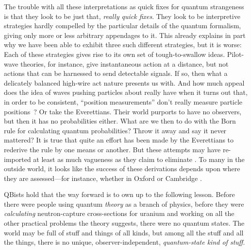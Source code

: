 \documentclass[aps,pra,superscriptaddress,12pt,tightenlines,nofootinbib]{revtex4-2}
\begin{document}
The trouble with all these interpretations as quick fixes for quantum strangeness is that they look to be just that, {\it really quick fixes}.  They look to be interpretive strategies hardly compelled by the particular details of the quantum formalism, giving only more or less arbitrary appendages to it.  This already explains in part why we have been able to exhibit three such different strategies, but it is worse:  Each of these strategies gives rise to its own set of tough-to-swallow ideas.  Pilot-wave theories, for instance, give instantaneous action at a distance, but not actions that can be harnessed to send detectable signals.  If so, then what a delicately balanced high-wire act nature presents us with.  And how much appeal does the idea of waves pushing particles about really have when it turns out that, in order to be consistent, ``position measurements'' don't really measure particle positions~\cite{Gisin15}?  Or take the Everettians.  Their world purports to have no observers, but then it has no probabilities either.  What are we then to do with the Born rule for calculating quantum probabilities?  Throw it away and say it never mattered?  It is true that quite an effort has been made by the Everettians to rederive the rule by one means or another.  But these attempts may have re-imported at least as much vagueness as they claim to eliminate \cite{Caves05, Kent14, Kastner14, Adlam14, Jansson16}. To many in the outside world, it looks like the success of these derivations depends upon where they are assessed---for instance, whether in Oxford \cite{Saunders05, Wallace09} or Cambridge \cite{Price08, Kent09}.

QBists hold that the way forward is to own up to the following lesson.  Before there were people using quantum {\it theory\/} as a branch of physics, before they were {\it calculating\/} neutron-capture cross-sections for uranium and working on all the other practical problems the theory suggests, there were no quantum states.  The world may be full of stuff and things of all kinds, but among all the stuff and all the things, there is no unique, observer-independent, {\it quantum-state kind of stuff}.
\end{document}
